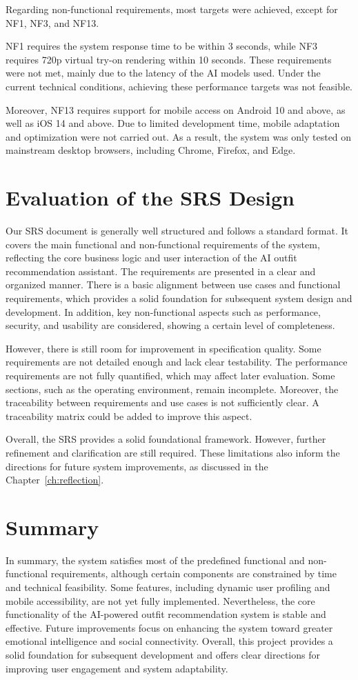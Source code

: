 Regarding non-functional requirements, most targets were achieved, except for NF1, NF3, and NF13.

NF1 requires the system response time to be within 3 seconds, while NF3 requires 720p virtual try-on rendering within 10 seconds. These requirements were not met, mainly due to the latency of the AI models used. Under the current technical conditions, achieving these performance targets was not feasible.

Moreover, NF13 requires support for mobile access on Android 10 and above, as well as iOS 14 and above. Due to limited development time, mobile adaptation and optimization were not carried out. As a result, the system was only tested on mainstream desktop browsers, including Chrome, Firefox, and Edge.


\section{Evaluation of the SRS Design}
Our SRS document is generally well structured and follows a standard format. 
It covers the main functional and non-functional requirements of the system, 
reflecting the core business logic and user interaction of the AI outfit recommendation assistant. 
The requirements are presented in a clear and organized manner. 
There is a basic alignment between use cases and functional requirements, 
which provides a solid foundation for subsequent system design and development. 
In addition, key non-functional aspects such as performance, security, and usability are considered, showing a certain level of completeness.

However, there is still room for improvement in specification quality. 
Some requirements are not detailed enough and lack clear testability. 
The performance requirements are not fully quantified, which may affect later evaluation. 
Some sections, such as the operating environment, remain incomplete. 
Moreover, the traceability between requirements and use cases is not sufficiently clear. 
A traceability matrix could be added to improve this aspect. 

Overall, the SRS provides a solid foundational framework. However, further refinement and clarification are still required. 
These limitations also inform the directions for future system improvements, as discussed in the Chapter~\ref{ch:reflection}.


\section{Summary}
In summary, the system satisfies most of the predefined functional and non-functional requirements, although certain components are constrained by time and technical feasibility. Some features, including dynamic user profiling and mobile accessibility, are not yet fully implemented. Nevertheless, the core functionality of the AI-powered outfit recommendation system is stable and effective. Future improvements focus on enhancing the system toward greater emotional intelligence and social connectivity. Overall, this project provides a solid foundation for subsequent development and offers clear directions for improving user engagement and system adaptability.
